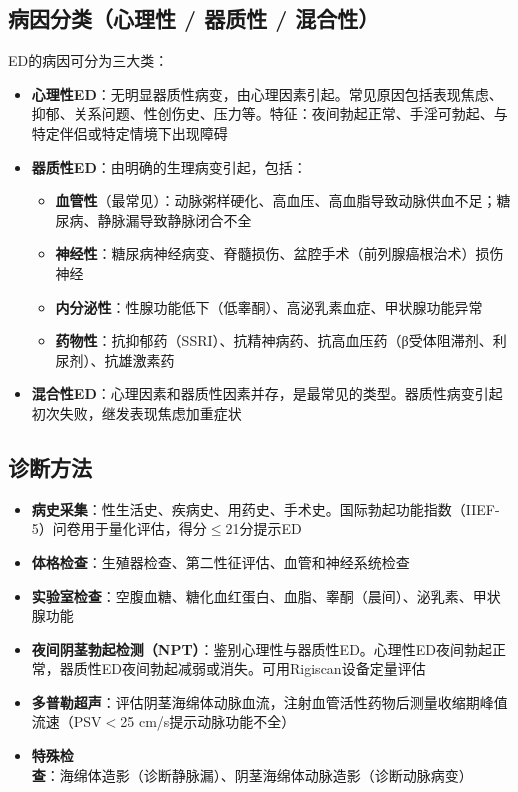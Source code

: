 \subsection{病因分类（心理性 / 器质性 / 混合性）}

ED的病因可分为三大类：

\begin{itemize}[leftmargin=2cm]
	\item \textbf{心理性ED}：无明显器质性病变，由心理因素引起。常见原因包括表现焦虑、抑郁、关系问题、性创伤史、压力等。特征：夜间勃起正常、手淫可勃起、与特定伴侣或特定情境下出现障碍
	\item \textbf{器质性ED}：由明确的生理病变引起，包括：
		\begin{itemize}
		\item \textbf{血管性}（最常见）：动脉粥样硬化、高血压、高血脂导致动脉供血不足；糖尿病、静脉漏导致静脉闭合不全
		\item \textbf{神经性}：糖尿病神经病变、脊髓损伤、盆腔手术（前列腺癌根治术）损伤神经
		\item \textbf{内分泌性}：性腺功能低下（低睾酮）、高泌乳素血症、甲状腺功能异常
		\item \textbf{药物性}：抗抑郁药（SSRI）、抗精神病药、抗高血压药（β受体阻滞剂、利尿剂）、抗雄激素药
		\end{itemize}
	\item \textbf{混合性ED}：心理因素和器质性因素并存，是最常见的类型。器质性病变引起初次失败，继发表现焦虑加重症状
\end{itemize}

\subsection{诊断方法}

\begin{itemize}[leftmargin=2cm]
	\item \textbf{病史采集}：性生活史、疾病史、用药史、手术史。国际勃起功能指数（IIEF-5）问卷用于量化评估，得分$\leq$21分提示ED
	\item \textbf{体格检查}：生殖器检查、第二性征评估、血管和神经系统检查
	\item \textbf{实验室检查}：空腹血糖、糖化血红蛋白、血脂、睾酮（晨间）、泌乳素、甲状腺功能
	\item \textbf{夜间阴茎勃起检测（NPT）}：鉴别心理性与器质性ED。心理性ED夜间勃起正常，器质性ED夜间勃起减弱或消失。可用Rigiscan设备定量评估
	\item \textbf{多普勒超声}：评估阴茎海绵体动脉血流，注射血管活性药物后测量收缩期峰值流速（PSV$<$25 cm/s提示动脉功能不全）
	\item \textbf{特殊检查}：海绵体造影（诊断静脉漏）、阴茎海绵体动脉造影（诊断动脉病变）
\end{itemize}


